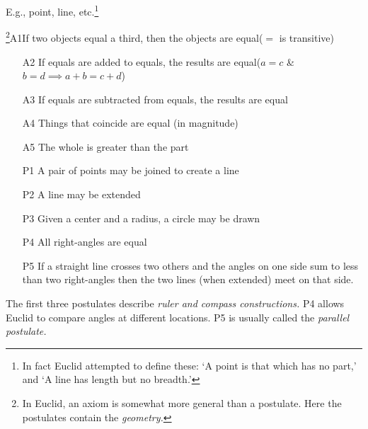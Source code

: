 
\begin{description}\itemsep0pt
	\item[\normalfont\emph{Undefined Terms}] E.g., point, line, etc.\footnote{In fact Euclid attempted to define these: `A point is that which has no part,' and `A line has length but no breadth.'}
	\item[\normalfont\emph{Axioms/Postulates}]\negthickspace\!\footnote{%
		In Euclid, an axiom is somewhat more general than a postulate. Here the postulates contain the \emph{geometry.}%
	}\lstsp A1\lstsp If two objects equal a third, then the objects are equal\hfill ($=$ is transitive)\vspace{-5pt}
	\begin{itemize}
		\item[A2] If equals are added to equals, the results are equal\hfill ($a=c$ \& $b=d\implies a+b=c+d$)
		\item[A3] If equals are subtracted from equals, the results are equal
		\item[A4] Things that coincide are equal (in magnitude)
		\item[A5] The whole is greater than the part
		\item[P1] A pair of points may be joined to create a line
		\item[P2] A line may be extended
		\item[P3] Given a center and a radius, a circle may be drawn
		\item[P4] All right-angles are equal
		\item[P5] If a straight line crosses two others and the angles on one side sum to less than two right-angles then the two lines (when extended) meet on that side.
	\end{itemize}
\end{description}

\goodbreak

The first three postulates describe \emph{ruler and compass constructions.} P4 allows Euclid to compare angles at different locations. P5 is usually called the \emph{parallel postulate.}
\medbreak

